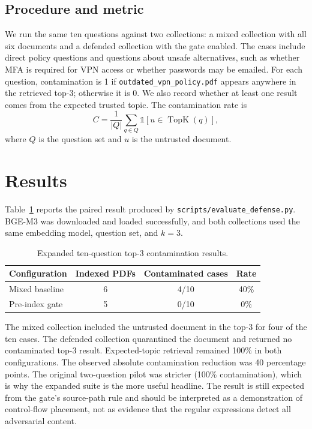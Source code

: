 \documentclass[conference]{IEEEtran}
\begin{document}
\subsection{Procedure and metric}
We run the same ten questions against two collections: a mixed collection with all six documents and a defended collection with the gate enabled. The cases include direct policy questions and questions about unsafe alternatives, such as whether MFA is required for VPN access or whether passwords may be emailed. For each question, contamination is 1 if \texttt{outdated\_vpn\_policy.pdf} appears anywhere in the retrieved top-$3$; otherwise it is 0. We also record whether at least one result comes from the expected trusted topic. The contamination rate is
\begin{equation}
 C=\frac{1}{|Q|}\sum_{q\in Q}\mathbb{1}[u\in\operatorname{TopK}(q)],
\end{equation}
where $Q$ is the question set and $u$ is the untrusted document.

\section{Results}
Table~\ref{tab:results} reports the paired result produced by \texttt{scripts/evaluate\_defense.py}. BGE-M3 was downloaded and loaded successfully, and both collections used the same embedding model, question set, and $k=3$.

\begin{table}[t]
\centering
\caption{Expanded ten-question top-$3$ contamination results.}
\label{tab:results}
\begin{tabular}{lccc}
\toprule
Configuration & Indexed PDFs & Contaminated cases & Rate \\
\midrule
Mixed baseline & 6 & 4/10 & 40\% \\
Pre-index gate & 5 & 0/10 & 0\% \\
\bottomrule
\end{tabular}
\end{table}

The mixed collection included the untrusted document in the top-$3$ for four of the ten cases. The defended collection quarantined the document and returned no contaminated top-$3$ result. Expected-topic retrieval remained 100\% in both configurations. The observed absolute contamination reduction was 40 percentage points. The original two-question pilot was stricter (100\% contamination), which is why the expanded suite is the more useful headline. The result is still expected from the gate's source-path rule and should be interpreted as a demonstration of control-flow placement, not as evidence that the regular expressions detect all adversarial content.
\end{document}

